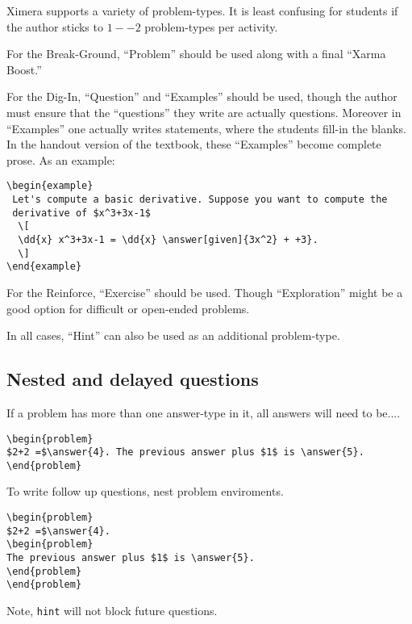 \documentclass{article}
\newcommand{\dd}[2][]{\frac{d #1}{d #2}}
\begin{document}
Ximera supports a variety of problem-types. It is least confusing for
students if the author sticks to $1--2$ problem-types per activity.



For the Break-Ground, ``Problem'' should be used along with a final ``Xarma
Boost.''



For the Dig-In, ``Question'' and ``Examples'' should be used, though
the author must ensure that the ``questions'' they write are actually
questions. Moreover in ``Examples'' one actually writes statements,
where the students fill-in the blanks. In the handout version of the
textbook, these ``Examples'' become complete prose. As an example:

\begin{verbatim}
\begin{example}
 Let's compute a basic derivative. Suppose you want to compute the
 derivative of $x^3+3x-1$
  \[
  \dd{x} x^3+3x-1 = \dd{x} \answer[given]{3x^2} + +3}.
  \]
\end{example}
\end{verbatim}


For the Reinforce, ``Exercise'' should be used. Though ``Exploration''
might be a good option for difficult or open-ended problems.



In all cases, ``Hint'' can also be used as an additional problem-type.


\subsection*{Nested and delayed questions}


If a problem has more than one answer-type in it, all answers will
need to be....

\begin{verbatim}
\begin{problem}
$2+2 =$\answer{4}. The previous answer plus $1$ is \answer{5}.  
\end{problem}
\end{verbatim}

To write follow up questions, nest problem enviroments.

\begin{verbatim}
\begin{problem}
$2+2 =$\answer{4}. 
\begin{problem}
The previous answer plus $1$ is \answer{5}.  
\end{problem}
\end{problem}
\end{verbatim}
Note, \verb|hint| will not block future questions.
\end{document}
